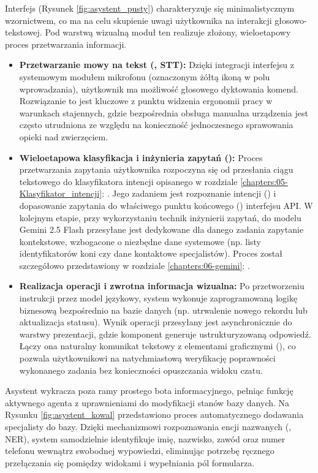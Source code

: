 Interfejs  (Rysunek \ref{fig:asystent_pusty}) charakteryzuje się minimalistycznym wzornictwem, co ma na celu skupienie uwagi użytkownika na interakcji głosowo-tekstowej. Pod warstwą wizualną moduł ten realizuje złożony, wieloetapowy proces przetwarzania informacji.

\begin{itemize}
    \item \textbf{Przetwarzanie mowy na tekst (, STT):} Dzięki integracji interfejsu z systemowym modułem mikrofonu (oznaczonym żółtą ikoną w polu wprowadzania), użytkownik ma możliwość głosowego dyktowania komend. Rozwiązanie to jest kluczowe z punktu widzenia ergonomii pracy w warunkach stajennych, gdzie bezpośrednia obsługa manualna urządzenia jest często utrudniona ze względu na konieczność jednoczesnego sprawowania opieki nad zwierzęciem.
    \item \textbf{Wieloetapowa klasyfikacja i inżynieria zapytań ():} Proces przetwarzania zapytania użytkownika rozpoczyna się od przesłania ciągu tekstowego do klasyfikatora intencji opisanego w rozdziale \ref{chapters:05-Klasyfikator_intencji}: . Jego zadaniem jest rozpoznanie intencji () i dopasowanie zapytania do właściwego punktu końcowego () interfejsu API. W kolejnym etapie, przy wykorzystaniu technik inżynierii zapytań, do modelu Gemini 2.5 Flash przesyłane jest dedykowane dla danego zadania zapytanie kontekstowe, wzbogacone o niezbędne dane systemowe (np. listy identyfikatorów koni czy dane kontaktowe specjalistów). Proces został szczegółowo przedstawiony w rozdziale \ref{chapters:06-gemini}: .
    \item \textbf{Realizacja operacji i zwrotna informacja wizualna:} Po przetworzeniu instrukcji przez model językowy, system wykonuje zaprogramowaną logikę biznesową bezpośrednio na bazie danych (np. utrwalenie nowego rekordu lub aktualizacja statusu). Wynik operacji przesyłany jest asynchronicznie do warstwy prezentacji, gdzie komponent  generuje ustrukturyzowaną odpowiedź. Łączy ona naturalny komunikat tekstowy z elementami graficznymi (), co pozwala użytkownikowi na natychmiastową weryfikację poprawności wykonanego zadania bez konieczności opuszczania widoku czatu.
\end{itemize}

Asystent wykracza poza ramy prostego bota informacyjnego, pełniąc funkcję aktywnego agenta z uprawnieniami do modyfikacji stanów bazy danych. Na Rysunku \ref{fig:asystent_kowal} przedstawiono proces automatycznego dodawania specjalisty do bazy. Dzięki mechanizmowi rozpoznawania encji nazwanych (, NER), system samodzielnie identyfikuje imię, nazwisko, zawód oraz numer telefonu wewnątrz swobodnej wypowiedzi, eliminując potrzebę ręcznego przełączania się pomiędzy widokami i wypełniania pól formularza.

